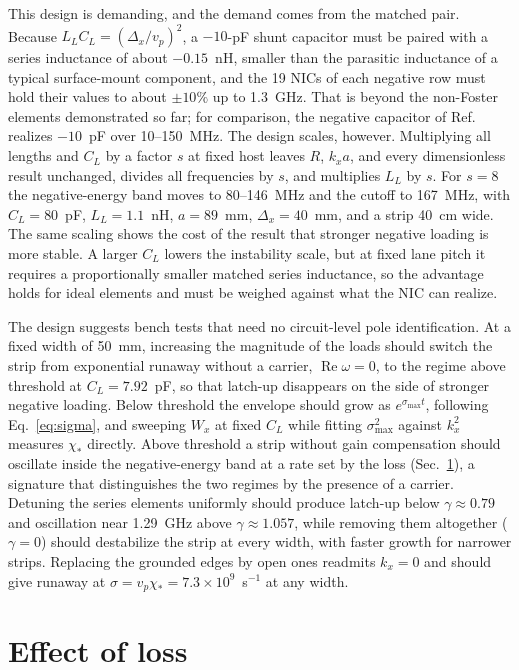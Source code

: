 \documentclass[aps,prapplied,twocolumn,superscriptaddress,floatfix,longbibliography]{revtex4-2}
\begin{document}
This design is demanding, and the demand comes from the matched pair. Because $L_LC_L=(\Delta_x/v_p)^2$, a $-10$-pF shunt capacitor must be paired with a series inductance of about $-0.15$~nH, smaller than the parasitic inductance of a typical surface-mount component, and the 19 NICs of each negative row must hold their values to about $\pm10\%$ up to 1.3~GHz. That is beyond the non-Foster elements demonstrated so far; for comparison, the negative capacitor of Ref.~\cite{Long_2014:TMTT} realizes $-10$~pF over 10--150~MHz. The design scales, however. Multiplying all lengths and $C_L$ by a factor $s$ at fixed host leaves $R$, $k_xa$, and every dimensionless result unchanged, divides all frequencies by $s$, and multiplies $L_L$ by $s$. For $s=8$ the negative-energy band moves to 80--146~MHz and the cutoff to 167~MHz, with $C_L=80$~pF, $L_L=1.1$~nH, $a=89$~mm, $\Delta_x=40$~mm, and a strip 40~cm wide. The same scaling shows the cost of the result that stronger negative loading is more stable. A larger $C_L$ lowers the instability scale, but at fixed lane pitch it requires a proportionally smaller matched series inductance, so the advantage holds for ideal elements and must be weighed against what the NIC can realize.

The design suggests bench tests that need no circuit-level pole identification. At a fixed width of 50~mm, increasing the magnitude of the loads should switch the strip from exponential runaway without a carrier, $\operatorname{Re}\omega=0$, to the regime above threshold at $C_L=7.92$~pF, so that latch-up disappears on the side of stronger negative loading. Below threshold the envelope should grow as $e^{\sigma_{\max}t}$, following Eq.~\eqref{eq:sigma}, and sweeping $W_x$ at fixed $C_L$ while fitting $\sigma_{\max}^2$ against $k_x^2$ measures $\chi_*$ directly. Above threshold a strip without gain compensation should oscillate inside the negative-energy band at a rate set by the loss (Sec.~\ref{sec:loss}), a signature that distinguishes the two regimes by the presence of a carrier. Detuning the series elements uniformly should produce latch-up below $\gamma\approx0.79$ and oscillation near 1.29~GHz above $\gamma\approx1.057$, while removing them altogether ($\gamma=0$) should destabilize the strip at every width, with faster growth for narrower strips. Replacing the grounded edges by open ones readmits $k_x=0$ and should give runaway at $\sigma=v_p\chi_*=7.3\times10^{9}$~s$^{-1}$ at any width.

\section{Effect of loss}
\label{sec:loss}
\end{document}
